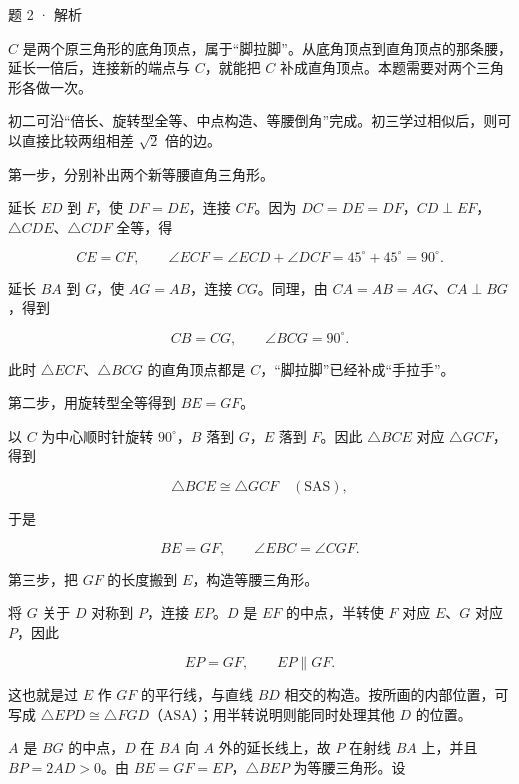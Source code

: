 \begin{solution}{题 2 · 解析}
\think

\(C\) 是两个原三角形的底角顶点，属于“脚拉脚”。从底角顶点到直角顶点的那条腰，延长一倍后，连接新的端点与 \(C\)，就能把 \(C\) 补成直角顶点。本题需要对两个三角形各做一次。

初二可沿“倍长、旋转型全等、中点构造、等腰倒角”完成。初三学过相似后，则可以直接比较两组相差 \(\sqrt{2}\) 倍的边。


\diagram{\hhTwoHands}

\solve

第一步，分别补出两个新等腰直角三角形。

延长 \(ED\) 到 \(F\)，使 \(DF=DE\)，连接 \(CF\)。因为 \(DC=DE=DF\)，\(CD\perp EF\)，\(\triangle CDE\)、\(\triangle CDF\) 全等，得

\[
CE=CF,\qquad
\angle ECF=\angle ECD+\angle DCF=45^\circ+45^\circ=90^\circ.
\]

延长 \(BA\) 到 \(G\)，使 \(AG=AB\)，连接 \(CG\)。同理，由 \(CA=AB=AG\)、\(CA\perp BG\)，得到

\[
CB=CG,\qquad \angle BCG=90^\circ.
\]

此时 \(\triangle ECF\)、\(\triangle BCG\) 的直角顶点都是 \(C\)，“脚拉脚”已经补成“手拉手”。

第二步，用旋转型全等得到 \(BE=GF\)。

以 \(C\) 为中心顺时针旋转 \(90^\circ\)，\(B\) 落到 \(G\)，\(E\) 落到 \(F\)。因此 \(\triangle BCE\) 对应 \(\triangle GCF\)，得到

\[
\triangle BCE\cong\triangle GCF\quad(\mathrm{SAS}),
\]

于是

\[
BE=GF,\qquad \angle EBC=\angle CGF.
\]

第三步，把 \(GF\) 的长度搬到 \(E\)，构造等腰三角形。

\diagram{\hhTwoParallel}

将 \(G\) 关于 \(D\) 对称到 \(P\)，连接 \(EP\)。\(D\) 是 \(EF\) 的中点，半转使 \(F\) 对应 \(E\)、\(G\) 对应 \(P\)，因此

\[
EP=GF,\qquad EP\parallel GF.
\]

这也就是过 \(E\) 作 \(GF\) 的平行线，与直线 \(BD\) 相交的构造。按所画的内部位置，可写成 \(\triangle EPD\cong \triangle FGD\)（\(\mathrm{ASA}\)）；用半转说明则能同时处理其他 \(D\) 的位置。

\(A\) 是 \(BG\) 的中点，\(D\) 在 \(BA\) 向 \(A\) 外的延长线上，故 \(P\) 在射线 \(BA\) 上，并且 \(BP=2AD>0\)。由 \(BE=GF=EP\)，\(\triangle BEP\) 为等腰三角形。设


\end{solution}
